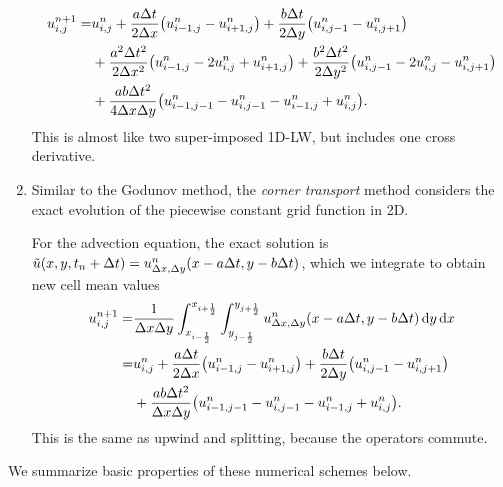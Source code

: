 \begin{enumerate}
	\begin{align*}
		u_{i, j}^{n + 1} = &u_{i, j}^n + \frac{a\Delta t}{2\Delta x}\parentheses*{u_{i - 1, j}^n - u_{i + 1, j}^n} + \frac{b\Delta t}{2\Delta y}\parentheses*{u_{i, j - 1}^n - u_{i, j + 1}^n}\\
		&+ \frac{a^2 \Delta t^2}{2\Delta x^2}\parentheses*{u_{i - 1, j}^n - 2u_{i, j}^n + u_{i + 1, j}^n} + \frac{b^2 \Delta t^2}{2\Delta y^2}\parentheses*{u_{i, j - 1}^n - 2u_{i, j}^n - u_{i, j + 1}^n}\\
		&+ \frac{ab\Delta t^2}{4\Delta x\Delta y}\parentheses*{u_{i - 1, j - 1}^n - u_{i, j - 1}^n - u_{i - 1, j}^n + u_{i, j}^n}.
	\end{align*}
	This is almost like two super-imposed 1D-LW, but includes one cross derivative.
	\item Similar to the Godunov method, the \emph{corner transport} method considers the exact evolution of the piecewise constant grid function in 2D.
	\begin{center}
	\end{center}
	For the advection equation, the exact solution is \(\tilde{u}\parentheses*{x, y, t_n + \Delta t} = u_{\Delta x, \Delta y}^n\parentheses*{x - a\Delta t, y - b\Delta t}\), which we integrate to obtain new cell mean values
	\begin{align*}
		u_{i, j}^{n + 1} = &\frac{1}{\Delta x\Delta y}\int_{x_{i - \frac{1}{2}}}^{x_{i + \frac{1}{2}}}\int_{y_{j - \frac{1}{2}}}^{y_{j + \frac{1}{2}}}u_{\Delta x, \Delta y}^n\parentheses*{x - a\Delta t, y - b\Delta t}\d y\d x\\
		= &u_{i, j}^n + \frac{a\Delta t}{2\Delta x}\parentheses*{u_{i - 1, j}^n - u_{i + 1, j}^n} + \frac{b\Delta t}{2\Delta y}\parentheses*{u_{i, j - 1}^n - u_{i, j + 1}^n}\\
		&+ \frac{ab\Delta t^2}{\Delta x\Delta y}\parentheses*{u_{i - 1, j - 1}^n - u_{i, j - 1}^n - u_{i - 1, j}^n + u_{i, j}^n}.
	\end{align*}
	This is the same as upwind and splitting, because the operators commute.
\end{enumerate}
We summarize basic properties of these numerical schemes below.

